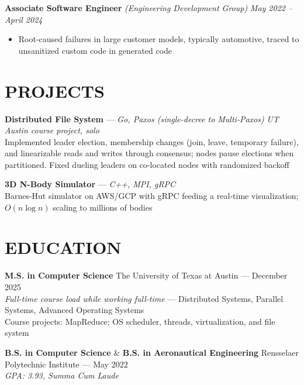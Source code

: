 \documentclass{article}
\begin{document}
{\large \textbf{Associate Software Engineer}} \textit{(Engineering Development Group)} \hfill \textit{May 2022 -- April 2024}
\begin{itemize}[leftmargin=*]
    \item Root-caused failures in large customer models, typically automotive, traced to unsanitized custom code in generated code
\end{itemize}

\section*{PROJECTS}
\textbf{Distributed File System} — \textit{Go, Paxos (single-decree to Multi-Paxos)} \hfill \textit{UT Austin course project, solo} \\
Implemented leader election, membership changes (join, leave, temporary failure), and linearizable reads and writes through consensus; nodes pause elections when partitioned. Fixed dueling leaders on co-located nodes with randomized backoff

\textbf{3D N-Body Simulator} — \textit{C++, MPI, gRPC} \\
Barnes-Hut simulator on AWS/GCP with gRPC feeding a real-time visualization; $O(n \log n)$ scaling to millions of bodies

\section*{EDUCATION}
\textbf{M.S. in Computer Science} \hfill The University of Texas at Austin — December 2025 \\
\textit{Full-time course load while working full-time} — Distributed Systems, Parallel Systems, Advanced Operating Systems \\
Course projects: MapReduce; OS scheduler, threads, virtualization, and file system

\textbf{B.S. in Computer Science} \& \textbf{B.S. in Aeronautical Engineering} \hfill Rensselaer Polytechnic Institute — May 2022 \\
\textit{GPA: 3.93, Summa Cum Laude}
\end{document}
